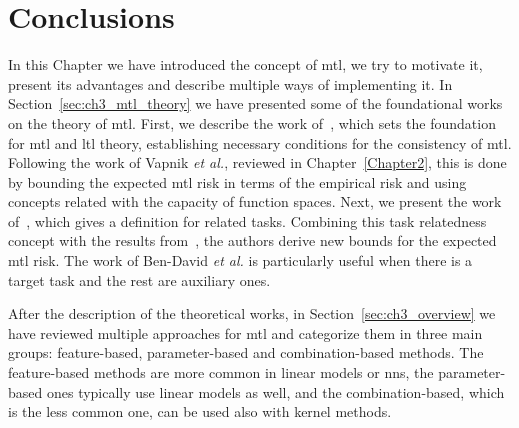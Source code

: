 












\section{Conclusions}\label{sec:conclusions_ch3}

In this Chapter we have introduced the concept of \acrshort{mtl}, we try to motivate it, present its advantages and describe multiple ways of implementing it.
%
In Section~\ref{sec:ch3_mtl_theory} we have presented some of the foundational works on the theory of \acrshort{mtl}. First, we describe the work of~\citep{baxter2000model}, which sets the foundation for \acrshort{mtl} and \acrshort{ltl} theory, establishing necessary conditions for the consistency of \acrshort{mtl}. Following the work of Vapnik \emph{et al.}, reviewed in Chapter~\ref{Chapter2}, this is done by bounding the expected \acrshort{mtl} risk in terms of the empirical risk and using concepts related with the capacity of function spaces. 
%
Next, we present the work of~\citet{Ben-DavidS03}, which gives a definition for related tasks. Combining this task relatedness concept with the results from~\citet{baxter2000model}, the authors derive new bounds for the expected \acrshort{mtl} risk. The work of Ben-David \emph{et al.} is particularly useful when there is a target task and the rest are auxiliary ones.
%

After the description of the theoretical works, in Section~\ref{sec:ch3_overview} we have reviewed multiple approaches for \acrshort{mtl} and categorize them in three main groups: feature-based, parameter-based and combination-based methods.
The feature-based methods are more common in linear models or \acrshort{nns}, the parameter-based ones typically use linear models as well, and the combination-based, which is the less common one, can be used also with kernel methods.

